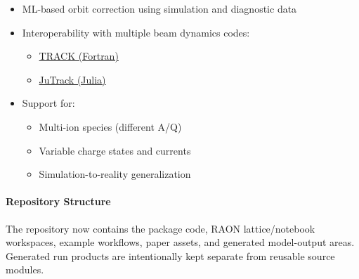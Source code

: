 \documentclass[
]{article}
\providecommand{\tightlist}{%
  \setlength{\itemsep}{0pt}\setlength{\parskip}{0pt}}
\begin{document}
\begin{itemize}
\tightlist
\item
  ML-based orbit correction using simulation and diagnostic data
\item
  Interoperability with multiple beam dynamics codes:

  \begin{itemize}
  \tightlist
  \item
    \href{https://www.phy.anl.gov/atlas/TRACK/}{TRACK (Fortran)}
  \item
    \href{https://github.com/MSU-Beam-Dynamics/JuTrack.jl}{JuTrack
    (Julia)}
  \end{itemize}
\item
  Support for:

  \begin{itemize}
  \tightlist
  \item
    Multi-ion species (different A/Q)
  \item
    Variable charge states and currents
  \item
    Simulation-to-reality generalization
  \end{itemize}
\end{itemize}

\hypertarget{repository-structure}{%
\paragraph{Repository Structure}\label{repository-structure}}

The repository now contains the package code, RAON lattice/notebook
workspaces, example workflows, paper assets, and generated model-output
areas. Generated run products are intentionally kept separate from
reusable source modules.
\end{document}
